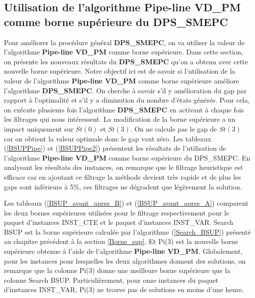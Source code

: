 \subsection{Utilisation de l'algorithme \textbf{Pipe-line VD\_PM} comme borne supérieure du DPS\_SMEPC}

Pour améliorer la procédure général \textbf{DPS\_SMEPC}, on va utiliser la valeur de l'algorithme \textbf{Pipe-line VD\_PM} comme borne supérieure. Dans cette section, on présente les nouveaux résultats du \textbf{DPS\_SMEPC} qu'on a obtenu avec cette nouvelle borne supérieure. Notre objectif ici est de savoir si l'utilisation de la valeur de l'algorithme \textbf{Pipe-line VD\_PM} comme borne supérieure améliore l'algorithme \textbf{DPS\_SMEPC}.
 On cherche à savoir s'il y amélioration du gap par rapport à l'optimalité et s'il y a diminution du nombre d'états générés.
Pour cela, on exécute plusieurs fois l'algorithme \textbf{DPS\_SMEPC} en activant à chaque fois les filtrages qui nous intéressent. La modification de la borne supérieure a un impact uniquement sur $St(0)$ et $St(3)$. On ne calcule pas le gap de $St(3)$ car on obtient la valeur optimale donc le gap vaut zéro. Les tableaux (\ref{BSUPPipe}) et (\ref{BSUPPipe2}) présentent les résultats de l'utilisation de l'algorithme \textbf{Pipe-line VD\_PM} comme borne supérieure du DPS\_SMEPC. En analysant les résultats des instances, on remarque que le filtrage heuristique est efficace car en ajoutant ce filtrage la méthode devient très rapide et de plus les gaps sont inférieurs à 5\%, ces filtrages ne dégradent que légèrement la solution.

Les tableaux (\ref{BSUP_avant_apres_B}) et (\ref{BSUP_avant_apres_A}) comparent les deux bornes supérieures utilisées pour le filtrage respectivement pour le paquet d'instances INST\_CTE et le paquet d'instances INST\_VAR. \og  Search BSUP\fg{} est la borne supérieure calculée par l'algorithme (\ref{Search_BSUP}) présenté au chapitre précédent à la section \ref{Borne_sup}. Et \og Pi(3)\fg{} est la nouvelle borne supérieure obtenue à l'aide de l'algorithme \textbf{Pipe-line VD\_PM}. Globalement, pour les instances pour lesquelles les deux algorithmes donnent des solutions, on remarque que la colonne \og Pi(3)\fg{} donne une meilleure borne supérieure que la colonne \og  Search BSUP\fg{}. Particulièrement, pour onze instances du paquet d'instances INST\_VAR, \og Pi(3)\fg{} ne trouve pas de solutions en moins d'une heure. %


